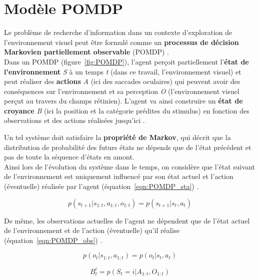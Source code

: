 \section{Modèle POMDP} %
Le problème de recherche d'information dans un contexte d'exploration de l'environnement visuel peut être formulé comme un \textbf{processus de décision Markovien partiellement observable} (POMDP) \autocite{Butko2010}. \\
Dans un POMDP (figure~\ref{fig:POMDP}), l'agent perçoit partiellement l'\textbf{état de l'environnement} \textit{S} à un temps \textit{t} (dans ce travail, l'environnement visuel) et peut réaliser des \textbf{actions} \textit{A} (ici des saccades oculaires) qui peuvent avoir des conséquences sur l'environnement et sa perception \textit{O} (l'environnement visuel perçut au travers du champs rétinien). L'agent va ainsi construire un \textbf{état de croyance} \textit{B} (ici la position et la catégorie prédites du stimulus) en fonction des observations et des actions réalisées jusqu'ici \autocite{Butko2010}.

Un tel système doit satisfaire la \textbf{propriété de Markov}, qui décrit que la distribution de probabilité des futurs états ne dépends que de l'état précédent et pas de toute la séquence d'états en amont.\\
Ainsi lors de l'évolution du système dans le temps, on considère que l'état suivant de l'environnement est uniquement influencé par son état actuel et l'action (éventuelle) réalisée par l'agent (équation~\ref{eqn:POMDP_sta}) \autocite{Butko2010}. 

\begin{equation}
p(s_{t+1}|s_{1:t},a_{1:t},o_{1:t}) = p(s_{t+1}|s_{t},a_{t})
\label{eqn:POMDP_sta}
\end{equation}

De même, les observations actuelles de l'agent ne dépendent que de l'état actuel de l'environnement et de l'action (éventuelle) qu'il réalise (équation~\ref{eqn:POMDP_obs}) \autocite{Butko2010}.

\begin{equation}
p(o_{t}|s_{1:t},a_{1:t}) = p(o_{t}|s_{t},a_{t})
\label{eqn:POMDP_obs}
\end{equation}

\begin{equation}
B_{t}^i = p(S_{t} = i|A_{1:t},O_{1:t})
\label{eqn:POMDP_bel}
\end{equation}


